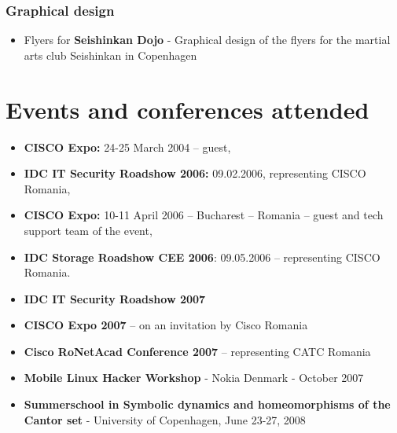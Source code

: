 		\subsubsection{Graphical design}
		\begin{itemize}
			\item Flyers for \textbf{Seishinkan Dojo} - Graphical design of the flyers for the martial arts club Seishinkan in Copenhagen
		\end{itemize}
		
		
		
\section{Events and conferences attended}
	\begin{itemize}
		\item \textbf{CISCO Expo:}  24-25 March 2004 – guest,
		\item \textbf{IDC IT Security Roadshow 2006:} 09.02.2006, representing CISCO Romania,
		\item \textbf{CISCO Expo:} 10-11 April 2006 – Bucharest – Romania – guest and tech support team of the event,
		\item \textbf{IDC Storage Roadshow CEE 2006}: 09.05.2006 – representing CISCO Romania. 
		\item \textbf{IDC IT Security Roadshow 2007} 
		\item \textbf{CISCO Expo 2007} – on an invitation by Cisco Romania
		\item \textbf{Cisco RoNetAcad Conference 2007} – representing CATC Romania
		\item \textbf{Mobile Linux Hacker Workshop} - Nokia Denmark - October 2007
		\item \textbf{Summerschool in Symbolic dynamics and homeomorphisms of the Cantor set} - University of Copenhagen, June 23-27, 2008  
	\end{itemize}
